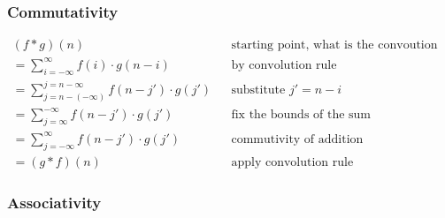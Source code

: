 \documentclass[11pt]{article}
\begin{document}
\subsubsection{Commutativity}

\begin{definition}
    \begin{align*}
        (f\ast g)(n)                                           &  & \text{starting point, what is the convoution at position n?} \\
        = \sum^\infty_{i=-\infty}f(i) \cdot g(n-i)             &  & \text{by convolution rule}                                   \\
        = \sum^{j=n-\infty}_{j=n-(-\infty)}f(n-j') \cdot g(j') &  & \text{substitute } j'=n-i                                    \\
        = \sum^{-\infty}_{j=\infty}f(n-j') \cdot g(j')         &  & \text{fix the bounds of the sum}                             \\
        = \sum^\infty_{j=-\infty}f(n-j') \cdot g(j')           &  & \text{commutivity of addition}                               \\
        = (g*f)(n)                                             &  & \text{apply convolution rule}
    \end{align*}
\end{definition}

\subsubsection{Associativity}
\end{document}
